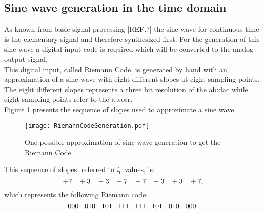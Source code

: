 \subsection{Sine wave generation in the time domain}
As known from basic signal processing 
[REF.?] the sine wave for continuous time is the elementary signal and therefore synthesized first. 
For the generation of this sine wave a digital input code is required which will be converted to the analog output signal.\\
This digital input, called Riemann Code, is generated by hand with an approximation of a sine wave with eight different slopes at eight sampling points. 
The eight different slopes represents a three bit resolution of the \gls{ab:dac} while eight sampling points refer to the \gls{ab:osr}.\\
Figure \ref{fig:RiemannCodeGenerationSineWave} presents the sequence of slopes used to approximate a sine wave. 

\begin{figure}[htb!]
   \centering
   \texttt{[image: RiemannCodeGeneration.pdf]}
   \caption{One possible approximation of sine wave generation to get the Riemann Code}
   \label{fig:RiemannCodeGenerationSineWave}
\end{figure}

This sequence of slopes, referred to $i_0$ values, is:
\begin{equation}
 +7\hspace{.3cm} +3\hspace{.3cm} -3\hspace{.3cm} -7\hspace{.3cm} -7\hspace{.3cm} -3\hspace{.3cm} +3\hspace{.3cm} +7,
 \end{equation} which represents the following Riemann code:
\begin{equation}
000\hspace{.3cm} 010\hspace{.3cm} 101\hspace{.3cm} 111\hspace{.3cm} 111\hspace{.3cm} 101\hspace{.3cm} 010\hspace{.3cm} 000.
\end{equation}
\label{eq:RiemannCodeSineWave} 
   
